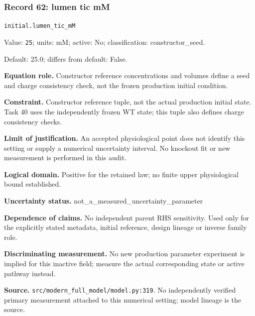 \subsubsection*{Record 62: lumen tic mM}
{\small \nolinkurl{initial.lumen_tic_mM}\par

Value: \texttt{25}; units: mM; active: No; classification: constructor\_seed.\par

Default: 25.0; differs from default: False.\par

\textbf{Equation role.} Constructor reference concentrations and volumes define a seed and charge consistency check, not the frozen production initial condition.\par

\textbf{Constraint.} Constructor reference tuple, not the actual production initial state. Task 40 uses the independently frozen WT state; this tuple also defines charge consistency checks.\par

\textbf{Limit of justification.} An accepted physiological point does not identify this setting or supply a numerical uncertainty interval. No knockout fit or new measurement is performed in this audit.\par

\textbf{Logical domain.} Positive for the retained law; no finite upper physiological bound established.\par

\textbf{Uncertainty status.} not\_a\_measured\_uncertainty\_parameter\par

\textbf{Dependence of claims.} No independent parent RHS sensitivity. Used only for the explicitly stated metadata, initial reference, design lineage or inverse family role.\par

\textbf{Discriminating measurement.} No new production parameter experiment is implied for this inactive field; measure the actual corresponding state or active pathway instead.\par

\textbf{Source.} \nolinkurl{src/modern_full_model/model.py:319}. No independently verified primary measurement attached to this numerical setting; model lineage is the source.\par}

